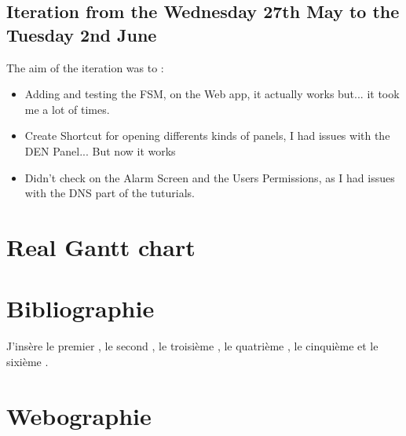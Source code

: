 \documentclass[a4paper, 10pt]{article}
\begin{document}
\subsection{Iteration from the Wednesday 27th May to the Tuesday 2nd June}
The aim of the iteration was to :
\begin{itemize}
    \item Adding and testing the FSM, on the Web app, it actually works but... it took me a lot of times.
    \item Create Shortcut for opening differents kinds of panels, I had issues with the DEN Panel... But now it works
    \item Didn't check on the Alarm Screen and the Users Permissions, as I had issues with the DNS part of the tuturials.
\end{itemize}

\newpage
\section{Real Gantt chart}

\section{Bibliographie}
J'insère le premier \cite{ref}, le second \cite{ref2}, le troisième \cite{ref3}, le quatrième \cite{ref4}, le cinquième \cite{ref5} et le sixième \cite{ref6}.


\section{Webographie}
\end{document}
